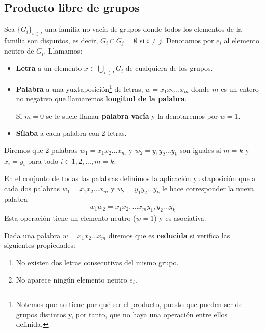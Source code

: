\subsection{Producto libre de grupos}

Sea $\{G_i\}_{i\in I}$ una familia no vacía de grupos donde todos los elementos de la familia son disjuntos, es decir, $G_i\cap G_j = \emptyset$ si $i\neq j$. Denotamos por $e_i$ al elemento neutro de $G_i$. Llamamos:
\begin{itemize}
    \item \textbf{Letra} a un elemento $x\in \bigcup\limits_{i\in I} G_i$ de cualquiera de los grupos.
    \item \textbf{Palabra} a una yuxtaposición\footnote{Notemos que no tiene por qué ser el producto, puesto que pueden ser de grupos distintos y, por tanto, que no haya una operación entre ellos definida.} de letras, $w = x_1 x_2... x_m$ donde $m$ es un entero no negativo que llamaremos \textbf{longitud de la palabra}.
    
    Si $m=0$ se le suele llamar \textbf{palabra vacía} y la denotaremos por $w=1$.
    \item \textbf{Sílaba} a cada palabra con 2 letras.
\end{itemize}

Diremos que 2 palabras $w_1=x_1x_2...x_m$ y $w_2=y_1y_2...y_k$ son iguales si $m=k$ y $x_i=y_i$ para todo $i\in 1,2,...,m=k$.

\begin{definicion}
    En el conjunto de todas las palabras definimos la aplicación yuxtaposición que a cada dos palabras $w_1=x_1x_2...x_m$ y $w_2=y_1y_2...y_k$ le hace corresponder la nueva palabra
    \begin{gather*}
        w_1w_2 = x_1x_2,...x_my_1,y_2...y_k
    \end{gather*}
    Esta operación tiene un elemento neutro ($w=1$) y es asociativa.
\end{definicion}

\begin{definicion}
    Dada una palabra $w=x_1x_2...x_m$ diremos que es \textbf{reducida} si verifica las siguientes propiedades:
    \begin{enumerate}
        \item No existen dos letras consecutivas del mismo grupo.
        \item No aparece ningún elemento neutro $e_i$.
    \end{enumerate}
\end{definicion}

